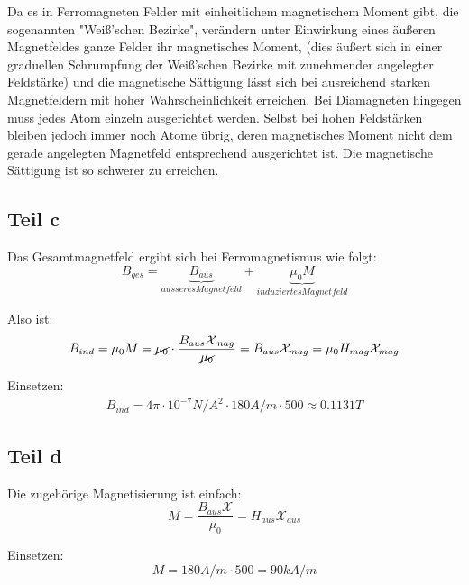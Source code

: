 \documentclass[a4paper,german,12pt,smallheadings]{scrartcl}
\begin{document}
Da es in Ferromagneten Felder mit einheitlichem magnetischem Moment gibt, die sogenannten "Weiß'schen Bezirke", verändern unter Einwirkung eines äußeren Magnetfeldes ganze Felder ihr magnetisches Moment, (dies äußert sich in einer graduellen Schrumpfung der Weiß'schen Bezirke mit zunehmender angelegter Feldstärke) und die magnetische Sättigung lässt sich bei ausreichend starken Magnetfeldern mit hoher Wahrscheinlichkeit erreichen.
Bei Diamagneten hingegen muss jedes Atom einzeln ausgerichtet werden. Selbst bei hohen Feldstärken bleiben jedoch immer noch Atome übrig, deren magnetisches Moment nicht dem gerade angelegten Magnetfeld entsprechend ausgerichtet ist. Die magnetische Sättigung ist so schwerer zu erreichen.

\subsection*{Teil c}

Das Gesamtmagnetfeld ergibt sich bei Ferromagnetismus wie folgt:
\begin{equation*}
B_{ges}=\underbrace{B_{aus}}_{ausseres Magnetfeld}+\underbrace{\mu_0M}_{induziertes Magnetfeld}
\end{equation*}

Also ist:
\begin{align*}
B_{ind}=\mu_0M=\cancel{\mu_0} \cdot \frac{B_{aus} \mathcal{X}_{mag}}{\cancel{\mu_0}}=B_{aus}\mathcal{X}_{mag}=\mu_0H_{mag}\mathcal{X}_{mag}
\end{align*}

Einsetzen:
\begin{align*}
B_{ind}=4\pi \cdot 10^{-7} N/A^2 \cdot 180 A/m \cdot 500 \approx 0.1131T
\end{align*}

\subsection*{Teil d}

Die zugehörige Magnetisierung ist einfach:
\begin{equation*}
M=\frac{B_{aus}\mathcal{X}}{\mu_0}=H_{aus} \mathcal{X}_{aus}
\end{equation*}

Einsetzen:
\begin{equation*}
M=180A/m \cdot 500=90kA/m
\end{equation*}
\end{document}
